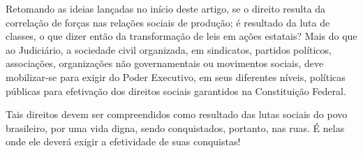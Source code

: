Retomando as ideias lançadas no início deste artigo, se o direito
resulta da correlação de forças nas relações sociais de produção; é
resultado da luta de classes, o que dizer então da transformação de leis
em ações estatais? Mais do que ao Judiciário, a sociedade civil
organizada, em sindicatos, partidos políticos, associações, organizações
não governamentais ou movimentos sociais, deve mobilizar-se para exigir
do Poder Executivo, em seus diferentes níveis, políticas públicas para
efetivação dos direitos sociais garantidos na Constituição Federal.

Tais direitos devem ser compreendidos como resultado das lutas sociais
do povo brasileiro, por uma vida digna, sendo conquistados, portanto,
nas ruas. É nelas onde ele deverá exigir a efetividade de suas
conquistas!
